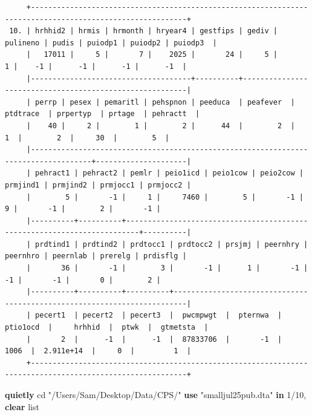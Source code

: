 \documentclass[
]{book}
\newenvironment{Shaded}{\begin{snugshade}}{\end{snugshade}}
\newcommand{\KeywordTok}[1]{\textcolor[rgb]{0.13,0.29,0.53}{\textbf{#1}}}
\newcommand{\NormalTok}[1]{#1}
\newcommand{\OtherTok}[1]{\textcolor[rgb]{0.56,0.35,0.01}{#1}}
\newcommand{\StringTok}[1]{\textcolor[rgb]{0.31,0.60,0.02}{#1}}
\begin{document}
\begin{verbatim}
     +----------------------------------------------------------------------------------------------------------+
 10. | hrhhid2 | hrmis | hrmonth | hryear4 | gestfips | gediv | pulineno | pudis | puiodp1 | puiodp2 | puiodp3  |
     |   17011 |     5 |       7 |    2025 |       24 |     5 |        1 |    -1 |      -1 |      -1 |      -1  |
     |-------------------------------------+----------+---------------------------------------------------------|
     | perrp | pesex | pemaritl | pehspnon | peeduca  | peafever  | ptdtrace  | prpertyp  | prtage  | pehractt  |
     |    40 |     2 |        1 |        2 |      44  |        2  |        1  |        2  |     30  |        5  |
     |------------------------------------------------------------------------------------+---------------------|
     | pehract1 | pehract2 | pemlr | peio1icd | peio1cow | peio2cow | prmjind1 | prmjind2 | prmjocc1 | prmjocc2 |
     |        5 |       -1 |     1 |     7460 |        5 |       -1 |        9 |       -1 |        2 |       -1 |
     |----------+----------+-------------------------------------------------------------------------+----------|
     | prdtind1 | prdtind2 | prdtocc1 | prdtocc2 | prsjmj | peernhry | peernhro | peernlab | prerelg | prdisflg |
     |       36 |       -1 |        3 |       -1 |      1 |       -1 |       -1 |       -1 |       0 |        2 |
     |----------+----------+----------+-------------------------------------------------------------------------|
     | pecert1  | pecert2  | pecert3  |  pwcmpwgt  |  pternwa  |  ptio1ocd  |     hrhhid  |  ptwk  |  gtmetsta  |
     |       2  |      -1  |      -1  |  87833706  |       -1  |      1006  |  2.911e+14  |     0  |         1  |
     +----------------------------------------------------------------------------------------------------------+
\end{verbatim}

\begin{Shaded}
\begin{Highlighting}[]
\KeywordTok{quietly}\NormalTok{ cd }\StringTok{"/Users/Sam/Desktop/Data/CPS/"}
\KeywordTok{use} \StringTok{"smalljul25pub.dta"} \KeywordTok{in}\NormalTok{ 1/10, }\KeywordTok{clear}
\OtherTok{list} 
\end{Highlighting}
\end{Shaded}
\end{document}
